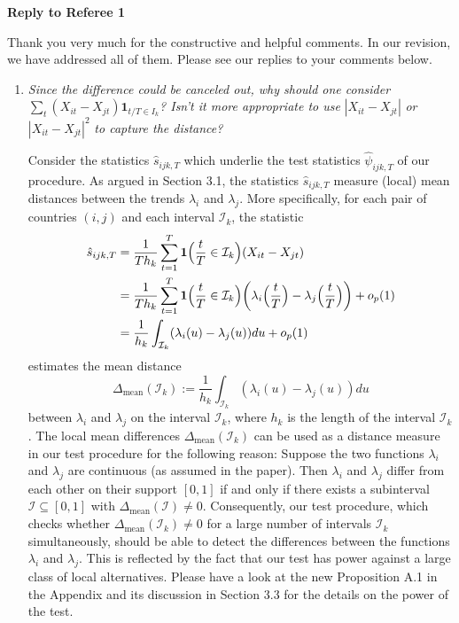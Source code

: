 \documentclass[a4paper,12pt]{article}
\begin{document}
\newpage
\begin{center}
{\large \bf Reply to Referee 1} 
\end{center}


Thank you very much for the constructive and helpful comments. In our revision, we have addressed all of them. Please see our replies to your comments below.


\begin{enumerate}[label=(\arabic*),leftmargin=0.7cm]


\item \textit{Since the difference could be canceled out, why should one consider} $\sum\nolimits_t (X_{it} - X_{jt})\mathbf{1}_{t/T \in I_k}$\textit{? Isn't it more appropriate to use} $|X_{it} - X_{jt}|$ \textit{ or } $|X_{it} - X_{jt}|^2$ \textit{to capture the distance?}

Consider the statistics $\hat{s}_{ijk,T}$ which underlie the test statistics $\hat{\psi}_{ijk,T}$ of our procedure. As argued in Section 3.1, the statistics $\hat{s}_{ijk,T}$ measure (local) mean distances between the trends $\lambda_i$ and $\lambda_j$. More specifically, for each pair of countries $(i,j)$ and each interval $\mathcal{I}_k$, the statistic
\begin{align*} 
\hat{s}_{ijk,T} 
 & = \frac{1}{Th_k} \sum\limits_{t=1}^T \boldsymbol{1}\Big(\frac{t}{T} \in \mathcal{I}_k\Big) (X_{it} - X_{jt}) \\
 & = \frac{1}{Th_k} \sum\limits_{t=1}^T \boldsymbol{1}\Big(\frac{t}{T} \in \mathcal{I}_k\Big) \bigg( \lambda_i \Big(\frac{t}{T}\Big)  - \lambda_j \Big(\frac{t}{T}\Big)\bigg) + o_p(1) \\
 & = \frac{1}{h_k} \int_{\mathcal{I}_k} (\lambda_i(u) - \lambda_j(u)) du + o_p(1) 
\end{align*}
estimates the mean distance 
\[ \Delta_{\text{mean}}(\mathcal{I}_k) := \frac{1}{h_k} \int_{\mathcal{I}_k} (\lambda_i(u) - \lambda_j(u)) du \]
between $\lambda_i$ and $\lambda_j$ on the interval $\mathcal{I}_k$, where $h_k$ is the length of the interval $\mathcal{I}_k$. The local mean differences $\Delta_{\text{mean}}(\mathcal{I}_k)$ can be used as a distance measure in our test procedure for the following reason: Suppose the two functions $\lambda_i$ and $\lambda_j$ are continuous (as assumed in the paper). Then $\lambda_i$ and $\lambda_j$ differ from each other on their support $[0,1]$ if and only if there exists a subinterval $\mathcal{I} \subseteq [0,1]$ with $\Delta_{\text{mean}}(\mathcal{I}) \ne 0$. Consequently, our test procedure, which checks whether $\Delta_{\text{mean}}(\mathcal{I}_k) \ne 0$ for a large number of intervals $\mathcal{I}_k$ simultaneously, should be able to detect the differences between the functions $\lambda_i$ and $\lambda_j$. This is reflected by the fact that our test has power against a large class of local alternatives. Please have a look at the new Proposition A.1 in the Appendix and its discussion in Section 3.3 for the details on the power of the test.


\end{enumerate}
\end{document}
